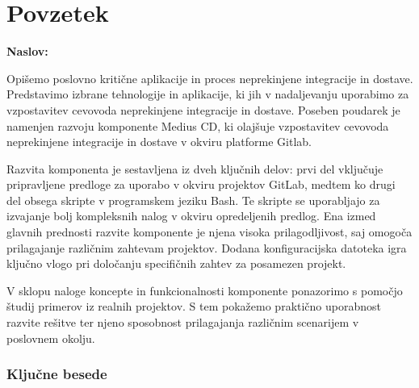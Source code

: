 \chapter*{Povzetek}

\noindent\textbf{Naslov:} \ttitle
\bigskip

Opišemo poslovno kritične aplikacije in proces neprekinjene integracije in dostave. Predstavimo izbrane tehnologije in aplikacije, ki jih v nadaljevanju uporabimo za vzpostavitev cevovoda neprekinjene integracije in dostave. Poseben poudarek je namenjen razvoju komponente Medius CD, ki olajšuje vzpostavitev cevovoda neprekinjene integracije in dostave v okviru platforme Gitlab.

Razvita komponenta je sestavljena iz dveh ključnih delov: prvi del vključuje pripravljene predloge za uporabo v okviru projektov GitLab, medtem ko drugi del obsega skripte v programskem jeziku Bash. Te skripte se uporabljajo za izvajanje bolj kompleksnih nalog v okviru opredeljenih predlog. Ena izmed glavnih prednosti razvite komponente je njena visoka prilagodljivost, saj omogoča prilagajanje različnim zahtevam projektov. Dodana konfiguracijska datoteka igra ključno vlogo pri določanju specifičnih zahtev za posamezen projekt.

V sklopu naloge koncepte in funkcionalnosti komponente ponazorimo s pomočjo študij primerov iz realnih projektov. S tem pokažemo praktično uporabnost razvite rešitve ter njeno sposobnost prilagajanja različnim scenarijem v poslovnem okolju.



\subsection*{Ključne besede}
\textit{\tkeywords}
\clearemptydoublepage

